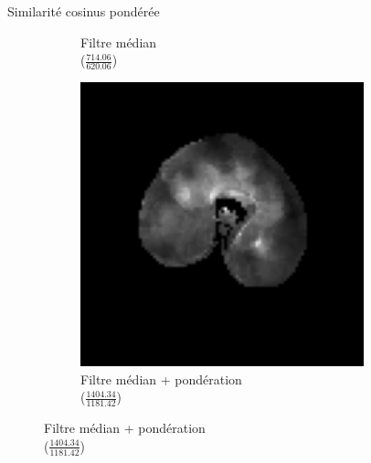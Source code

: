 \documentclass[10pt]{beamer}
\begin{document}
\begin{frame}{Similarité cosinus pondérée}
\begin{figure}[ht]
\begin{subfigure}[t]{0.31\textwidth}
      \caption{Filtre médian\\($\frac{714.06}{620.06}$)}
      \label{subfig:cosine_median}
    \end{subfigure}%
    \begin{subfigure}[t]{0.31\textwidth}
      \centering
      \includegraphics[width=0.9\textwidth]{fig/cosine_weight}
      \caption{Filtre médian + pondération\\($\frac{1404.34}{1181.42}$)}
      \label{subfig:cosine_weight}
    \end{subfigure}%

  \end{figure}
\end{frame}
\end{document}

